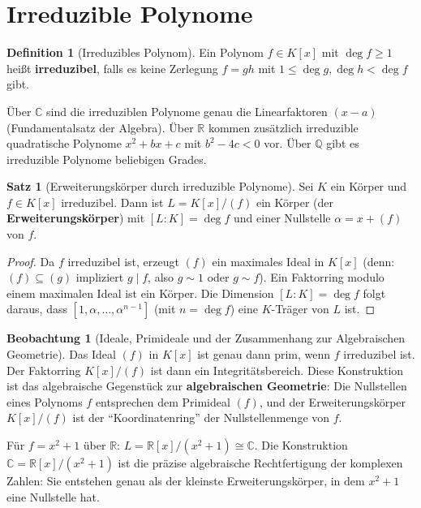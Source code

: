 ﻿\documentclass[a4paper,12pt]{report}
\theoremstyle{definition}
\newtheorem{definition}{Definition}
\newtheorem{satz}{Satz}
\newtheorem{beobachtung}{Beobachtung}
\begin{document}
\section{Irreduzible Polynome}

\begin{definition}[Irreduzibles Polynom]
    Ein Polynom $f \in K[x]$ mit $\deg f \geq 1$ heißt \textbf{irreduzibel},
    falls es keine Zerlegung $f = gh$ mit $1 \leq \deg g, \deg h < \deg f$ gibt.

    Über $\mathbb{C}$ sind die irreduziblen Polynome genau die Linearfaktoren
    $(x - a)$ (Fundamentalsatz der Algebra). Über $\mathbb{R}$ kommen
    zusätzlich irreduzible quadratische Polynome $x^2 + bx + c$ mit
    $b^2 - 4c < 0$ vor. Über $\mathbb{Q}$ gibt es irreduzible Polynome
    beliebigen Grades.
\end{definition}

\begin{satz}[Erweiterungskörper durch irreduzible Polynome]
    Sei $K$ ein Körper und $f \in K[x]$ irreduzibel. Dann ist
    $L = K[x]/(f)$ ein Körper (der \textbf{Erweiterungskörper})
    mit $[L : K] = \deg f$ und einer Nullstelle $\alpha = x + (f)$ von $f$.
\end{satz}
\begin{proof}
    Da $f$ irreduzibel ist, erzeugt $(f)$ ein maximales Ideal in $K[x]$
    (denn: $(f) \subseteq (g)$ impliziert $g \mid f$, also $g \sim 1$ oder $g \sim f$).
    Ein Faktorring modulo einem maximalen Ideal ist ein Körper.
    Die Dimension $[L:K] = \deg f$ folgt daraus, dass $[1, \alpha, \ldots, \alpha^{n-1}]$
    (mit $n = \deg f$) eine $K$-Träger von $L$ ist.
\end{proof}

\begin{beobachtung}[Ideale, Primideale und der Zusammenhang zur Algebraischen Geometrie]
    Das Ideal $(f)$ in $K[x]$ ist genau dann prim, wenn $f$ irreduzibel ist.
    Der Faktorring $K[x]/(f)$ ist dann ein Integritätsbereich.
    Diese Konstruktion ist das algebraische Gegenstück zur
    \textbf{algebraischen Geometrie}: Die Nullstellen eines Polynoms $f$
    entsprechen dem Primideal $(f)$, und der Erweiterungskörper $K[x]/(f)$
    ist der ``Koordinatenring'' der Nullstellenmenge von $f$.

    Für $f = x^2 + 1$ über $\mathbb{R}$: $L = \mathbb{R}[x]/(x^2+1) \cong \mathbb{C}$.
    Die Konstruktion $\mathbb{C} = \mathbb{R}[x]/(x^2+1)$ ist die präzise
    algebraische Rechtfertigung der komplexen Zahlen: Sie entstehen genau
    als der kleinste Erweiterungskörper, in dem $x^2 + 1$ eine Nullstelle hat.
\end{beobachtung}
\end{document}
